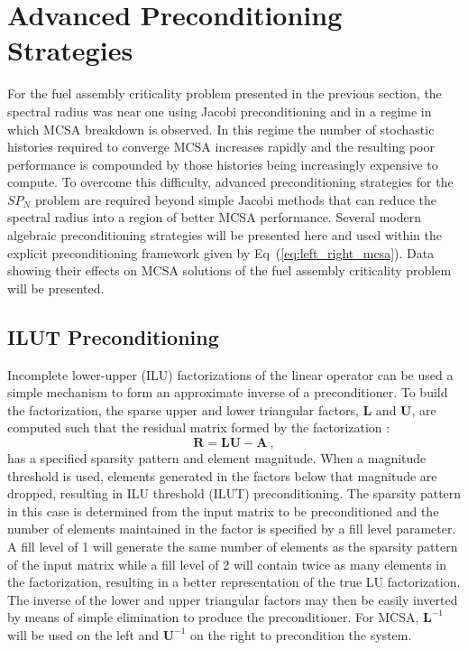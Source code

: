\clearpage

\section{Advanced Preconditioning Strategies}
\label{subsec:spn_advanced_preconditioning}
For the fuel assembly criticality problem presented in the previous
section, the spectral radius was near one using Jacobi preconditioning
and in a regime in which MCSA breakdown is observed. In this regime
the number of stochastic histories required to converge MCSA increases
rapidly and the resulting poor performance is compounded by those
histories being increasingly expensive to compute. To overcome this
difficulty, advanced preconditioning strategies for the $SP_N$ problem
are required beyond simple Jacobi methods that can reduce the spectral
radius into a region of better MCSA performance. Several modern
algebraic preconditioning strategies will be presented here and used
within the explicit preconditioning framework given by
Eq~(\ref{eq:left_right_mcsa}). Data showing their effects on MCSA
solutions of the fuel assembly criticality problem will be presented.

\subsection{ILUT Preconditioning}
\label{subsec:spn_ilut_preconditioning}
Incomplete lower-upper (ILU) factorizations of the linear operator can
be used a simple mechanism to form an approximate inverse of a
preconditioner. To build the factorization, the sparse upper and lower
triangular factors, $\mathbf{L}$ and $\mathbf{U}$, are computed such
that the residual matrix formed by the factorization
\cite{saad_iterative_2003}:
\begin{equation}
  \mathbf{R} = \mathbf{L} \mathbf{U} - \mathbf{A} \:,
  \label{eq:ilu_residual_matrix}
\end{equation}
has a specified sparsity pattern and element magnitude. When a
magnitude threshold is used, elements generated in the factors below
that magnitude are dropped, resulting in ILU threshold (ILUT)
preconditioning. The sparsity pattern in this case is determined from
the input matrix to be preconditioned and the number of elements
maintained in the factor is specified by a fill level parameter. A
fill level of 1 will generate the same number of elements as the
sparsity pattern of the input matrix while a fill level of 2 will
contain twice as many elements in the factorization, resulting in a
better representation of the true LU factorization. The inverse of the
lower and upper triangular factors may then be easily inverted by
means of simple elimination to produce the preconditioner. For MCSA,
$\mathbf{L}^{-1}$ will be used on the left and $\mathbf{U}^{-1}$ on
the right to precondition the system.

